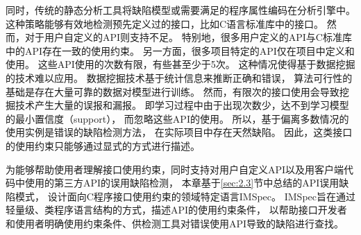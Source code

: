 同时，传统的静态分析工具将缺陷模型或需要满足的程序属性编码在分析引擎中。
这种策略能够有效地检测预先定义过的接口，比如C语言标准库中的接口。
然而，对于用户自定义的API则支持不足。
特别地，很多用户定义的API与C标准库中的API存在一致的使用约束。
另一方面，很多项目特定的API仅在项目中定义和使用。
这些API使用的次数有限，有些甚至少于5次。
这种情况使得基于数据挖掘的技术难以应用。
数据挖掘技术基于统计信息来推断正确和错误，
算法可行性的基础是存在大量可靠的数据对模型进行训练。
然而，有限次的接口使用会导致挖掘技术产生大量的误报和漏报。
即学习过程中由于出现次数少，达不到学习模型的最小置信度（support），
而忽略这些API的使用。
所以，基于偏离多数情况的使用实例是错误的缺陷检测方法，
在实际项目中存在天然缺陷。
因此，这类接口的使用约束只能够通过显式的方式进行描述。


为能够帮助使用者理解接口使用约束，同时支持对用户自定义API以及用客户端代码中使用的第三方API的误用缺陷检测，
本章基于\ref{sec:2.3}节中总结的API误用缺陷模式，
设计面向C程序接口使用约束的领域特定语言IMSpec。
IMSpec旨在通过轻量级、类程序语言结构的方式，描述API的使用约束条件，
以帮助接口开发者和使用者明确使用约束条件、供检测工具对错误使用API导致的缺陷进行查找。

